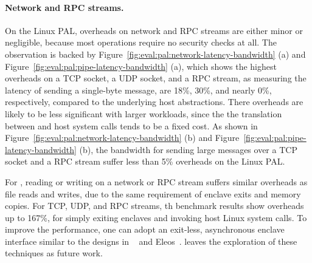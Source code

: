 






\paragraph{Network and RPC streams.}
On the Linux PAL, overheads on network and RPC streams are either minor or negligible,
because most operations require
no security checks at all.
The observation is backed by Figure~\ref{fig:eval:pal:network-latency-bandwidth} (a)
and
Figure~\ref{fig:eval:pal:pipe-latency-bandwidth} (a),
which shows the highest overheads on a TCP socket, a UDP socket, and a RPC stream,
as measuring the latency of sending a single-byte message,
are \roughly{}18\%, \roughly{}30\%,
and nearly 0\%, respectively, compared to the underlying host abstractions.
There overheads are likely to be less significant
with larger workloads,
since the the translation
between \thehostabi{} and host system calls
tends to be a fixed cost.
As shown in Figure~\ref{fig:eval:pal:network-latency-bandwidth} (b) and Figure~\ref{fig:eval:pal:pipe-latency-bandwidth} (b),
the bandwidth for sending large messages
over a TCP socket and a RPC stream suffer less than 5\% overheads on the Linux PAL.


For \sgx{}, reading or writing on a network or RPC stream
suffers similar overheads as file reads and writes,
due to the same requirement of enclave exits and memory copies.
For TCP, UDP, and RPC streams,
th benchmark results show overheads up to 167\%,
for simply exiting enclaves
and invoking host Linux system calls.
To improve the performance, one can adopt an exit-less, asynchronous enclave interface
similar to the designs in \scone{}~\cite{osdi16scone} and Eleos~\cite{orenbach17eleos}.
\graphene{} leaves the exploration of these techniques as future work.




